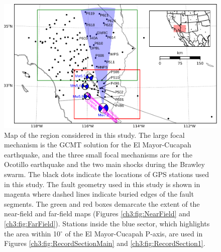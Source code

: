 \begin{figure}
\includegraphics[scale=1.0]{ch3/figures/2016jb013114-p01} 
\caption{Map of the region considered in this study.  The large focal
mechanism is the GCMT solution for the El Mayor-Cucapah earthquake,
and the three small focal mechanisms are for the Ocotillo earthquake
and the two main shocks during the Brawley swarm.  The black dots
indicate the locations of GPS stations used in this study.  The fault
geometry used in this study is shown in magenta where dashed lines
indicate buried edges of the fault segments.  The green and red boxes
demarcate the extent of the near-field and far-field maps (Figures
\ref{ch3:fig:NearField} and \ref{ch3:fig:FarField}).  Stations inside
the blue sector, which highlights the area within 10$^\circ$ of the El
Mayor-Cucapah P-axis, are used in Figures
\ref{ch3:fig:RecordSectionMain} and \ref{ch3:fig:RecordSection1}.}
\label{ch3:fig:ContextMap}
\end{figure}

